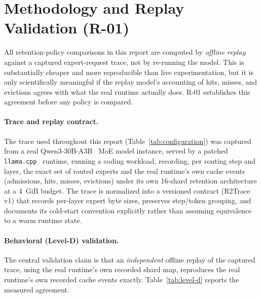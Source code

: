 \section{Methodology and Replay Validation (R-01)}
\label{sec:replay-validation}

All retention-policy comparisons in this report are computed by
\emph{offline replay} against a captured expert-request trace, not by
re-running the model. This is substantially cheaper and more reproducible
than live experimentation, but it is only scientifically meaningful if
the replay model's accounting of hits, misses, and evictions agrees with
what the real runtime actually does. R-01 establishes this agreement
before any policy is compared.



\paragraph{Trace and replay contract.} The trace used throughout this
report (Table~\ref{tab:configuration}) was captured from a real
Qwen3-30B-A3B~\cite{qwen3technicalreport} MoE model instance, served by
a patched \texttt{llama.cpp}~\cite{gerganov2023llamacpp} runtime, running
a coding workload, recording, per routing
step and layer, the exact set of routed experts and the real runtime's
own cache events (admissions, hits, misses, evictions) under its own
16-shard retention architecture at a 4~GiB budget. The trace is
normalized into a versioned contract (R2Trace v1) that records per-layer
expert byte sizes, preserves step/token grouping, and documents its
cold-start convention explicitly rather than assuming equivalence to a
warm runtime state.

\paragraph{Behavioral (Level-D) validation.} The central validation
claim is that an \emph{independent} offline replay of the captured trace,
using the real runtime's own recorded shard map, reproduces the real
runtime's own recorded cache events exactly. Table~\ref{tab:level-d}
reports the measured agreement.


